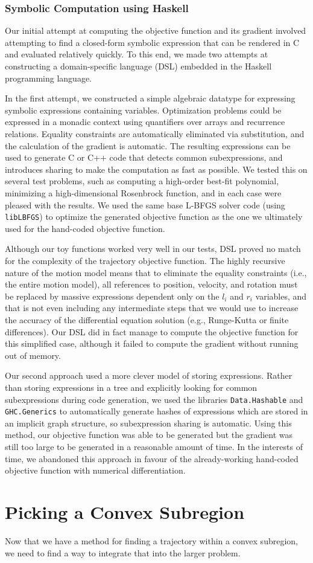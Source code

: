 \documentclass{report}
\begin{document}
\subsection{Symbolic Computation using Haskell}
Our initial attempt at computing the objective function and its gradient
involved attempting to find a closed-form symbolic expression that can be
rendered in C and evaluated relatively quickly. To this end, we made two attempts
at constructing a domain-specific language (DSL) embedded in the Haskell programming
language.

In the first attempt, we constructed a simple algebraic datatype for expressing
symbolic expressions containing variables. Optimization problems could be
expressed in a monadic context using quantifiers over arrays and recurrence
relations. Equality constraints are automatically eliminated via substitution,
and the calculation of the gradient is automatic. The resulting expressions can
be used to generate C or C++ code that detects common subexpressions, and
introduces sharing to make the computation as fast as possible. We tested this
on several test problems, such as computing a high-order best-fit polynomial,
minimizing a high-dimensional Rosenbrock function, and in each case were
pleased with the results. We used the same base L-BFGS solver code (using
\texttt{libLBFGS}) to optimize the generated objective function as the one we
ultimately used for the hand-coded objective function.

Although our toy functions worked very well in our tests, DSL proved no match
for the complexity of the trajectory objective function. The highly recursive
nature of the motion model means that to eliminate the equality constraints (i.e.,
the entire motion model), all references to position, velocity, and rotation
must be replaced by massive expressions dependent only on the $l_i$ and $r_i$
variables, and that is not even including any intermediate steps that we would
use to increase the accuracy of the differential equation solution (e.g., Runge-Kutta
or finite differences). Our DSL did in fact manage to compute the objective function
for this simplified case, although it failed to compute the gradient without
running out of memory.

Our second approach used a more clever model of storing expressions. Rather than
storing expressions in a tree and explicitly looking for common subexpressions
during code generation, we used the libraries \texttt{Data.Hashable} and \texttt{GHC.Generics}
to automatically generate hashes of expressions which are stored in an implicit
graph structure, so subexpression sharing is automatic. Using this method, our
objective function was able to be generated but the gradient was still too
large to be generated in a reasonable amount of time. In the interests of time,
we abandoned this approach in favour of the already-working hand-coded objective
function with numerical differentiation.

\chapter{Picking a Convex Subregion}
Now that we have a method for finding a trajectory within a convex subregion, we
need to find a way to integrate that into the larger problem.




\end{document}
